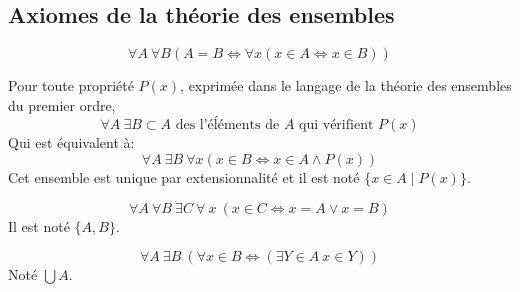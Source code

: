 \subsection{Axiomes de la théorie des ensembles}

\begin{axiom} [Extensionnalité]
	$$\forall A \ \forall B ( A = B \iff \forall x (x \in A \iff x \in B))$$
\end{axiom}

\begin{axiom} [Compréhension]
	Pour toute propriété $P(x)$, exprimée dans le langage de la théorie des ensembles du premier ordre,
	$$ \forall A \ \exists B \subset A \text{ des l'éĺéments de } A \text{ qui vérifient } P(x)$$
	Qui est équivalent à:
	$$ \forall A \  \exists B \  \forall x (x \in B \iff x \in A \land P(x))$$
	Cet ensemble est unique par extensionnalité et il est noté $\{x \in A \mid P(x)\}$.
\end{axiom}

\begin{axiom}
	$$ \forall A \  \forall B \  \exists C \  \forall \ x \  (x \in C \iff x = A \lor x = B)$$
	Il est noté $\{A,B\}$.
\end{axiom}


\begin{axiom}[Réunion]
	$$ \forall A \ \exists B \ (\forall x \in B \iff (\exists Y \in A  \ x \in  Y))$$
    Noté $\bigcup A$.
\end{axiom}



